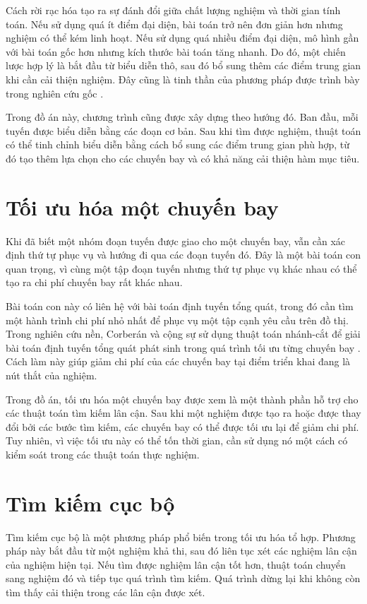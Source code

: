 Cách rời rạc hóa tạo ra sự đánh đổi giữa chất lượng nghiệm và thời gian tính toán. Nếu sử dụng quá ít điểm đại diện, bài toán trở nên đơn giản hơn nhưng nghiệm có thể kém linh hoạt. Nếu sử dụng quá nhiều điểm đại diện, mô hình gần với bài toán gốc hơn nhưng kích thước bài toán tăng nhanh. Do đó, một chiến lược hợp lý là bắt đầu từ biểu diễn thô, sau đó bổ sung thêm các điểm trung gian khi cần cải thiện nghiệm. Đây cũng là tinh thần của phương pháp được trình bày trong nghiên cứu gốc \cite{corberan2025mmdlarp}.

Trong đồ án này, chương trình cũng được xây dựng theo hướng đó. Ban đầu, mỗi tuyến được biểu diễn bằng các đoạn cơ bản. Sau khi tìm được nghiệm, thuật toán có thể tinh chỉnh biểu diễn bằng cách bổ sung các điểm trung gian phù hợp, từ đó tạo thêm lựa chọn cho các chuyến bay và có khả năng cải thiện hàm mục tiêu.

\section{Tối ưu hóa một chuyến bay}

Khi đã biết một nhóm đoạn tuyến được giao cho một chuyến bay, vẫn cần xác định thứ tự phục vụ và hướng đi qua các đoạn tuyến đó. Đây là một bài toán con quan trọng, vì cùng một tập đoạn tuyến nhưng thứ tự phục vụ khác nhau có thể tạo ra chi phí chuyến bay rất khác nhau.

Bài toán con này có liên hệ với bài toán định tuyến tổng quát, trong đó cần tìm một hành trình chi phí nhỏ nhất để phục vụ một tập cạnh yêu cầu trên đồ thị. Trong nghiên cứu nền, Corberán và cộng sự sử dụng thuật toán nhánh-cắt để giải bài toán định tuyến tổng quát phát sinh trong quá trình tối ưu từng chuyến bay \cite{corberan2007wgrp,corberan2025mmdlarp}. Cách làm này giúp giảm chi phí của các chuyến bay tại điểm triển khai đang là nút thắt của nghiệm.

Trong đồ án, tối ưu hóa một chuyến bay được xem là một thành phần hỗ trợ cho các thuật toán tìm kiếm lân cận. Sau khi một nghiệm được tạo ra hoặc được thay đổi bởi các bước tìm kiếm, các chuyến bay có thể được tối ưu lại để giảm chi phí. Tuy nhiên, vì việc tối ưu này có thể tốn thời gian, cần sử dụng nó một cách có kiểm soát trong các thuật toán thực nghiệm.

\section{Tìm kiếm cục bộ}

Tìm kiếm cục bộ là một phương pháp phổ biến trong tối ưu hóa tổ hợp. Phương pháp này bắt đầu từ một nghiệm khả thi, sau đó liên tục xét các nghiệm lân cận của nghiệm hiện tại. Nếu tìm được nghiệm lân cận tốt hơn, thuật toán chuyển sang nghiệm đó và tiếp tục quá trình tìm kiếm. Quá trình dừng lại khi không còn tìm thấy cải thiện trong các lân cận được xét.

